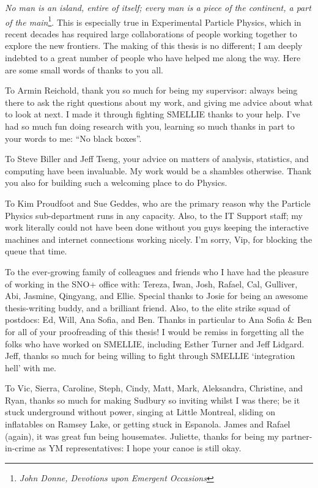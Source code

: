 
\begin{acknowledgements}      

\textit{No man is an island, entire of itself; every man is a piece of the continent, a part of the main}\footnote{\textit{John Donne, Devotions upon Emergent Occasions}}. 
This is especially true in Experimental Particle Physics, which in recent decades has required large collaborations of people working together to explore the new frontiers. The making of this thesis is no different; I am deeply indebted to a great number of people who have helped me along the way. Here are some small words of thanks to you all.

To Armin Reichold, thank you so much for being my supervisor: always being there to ask the right questions about my work, and giving me advice about what to look at next. I made it through fighting SMELLIE thanks to your help. I've had so much fun doing research with you, learning so much thanks in part to your words to me: ``No black boxes''.

To Steve Biller and Jeff Tseng, your advice on matters of analysis, statistics, and computing have been invaluable. My work would be a shambles otherwise. Thank you also for building such a welcoming place to do Physics.

To Kim Proudfoot and Sue Geddes, who are the primary reason why the Particle Physics sub-department runs in any capacity. Also, to the IT Support staff; my work literally could not have been done without you guys keeping the interactive machines and internet connections working nicely. I'm sorry, Vip, for blocking the queue that time.

To the ever-growing family of colleagues and friends who I have had the pleasure of working in the SNO+ office with: Tereza, Iwan, Josh, Rafael, Cal, Gulliver, Abi, Jasmine, Qingyang, and Ellie. Special thanks to Josie for being an awesome thesis-writing buddy, and a brilliant friend. Also, to the elite strike squad of postdocs: Ed, Will, Ana Sofia, and Ben. Thanks in particular to Ana Sofia \& Ben for all of your proofreading of this thesis! I would be remiss in forgetting all the folks who have worked on SMELLIE, including Esther Turner and Jeff Lidgard. Jeff, thanks so much for being willing to fight through SMELLIE `integration hell' with me.

To Vic, Sierra, Caroline, Steph, Cindy, Matt, Mark, Aleksandra, Christine, and Ryan, thanks so much for making Sudbury so inviting whilst I was there; be it stuck underground without power, singing at Little Montreal, sliding on inflatables on Ramsey Lake, or getting stuck in Espanola. James and Rafael (again), it was great fun being housemates. Juliette, thanks for being my partner-in-crime as YM representatives: I hope your canoe is still okay.


\end{acknowledgements}
